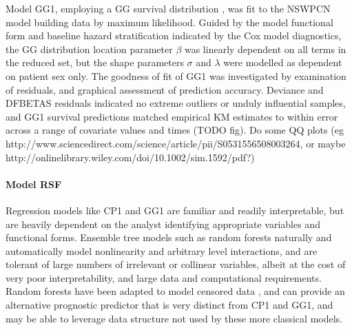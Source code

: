 \documentclass[dissertation.tex]{subfiles}
\begin{document}
Model GG1, employing a \gls{GG} survival distribution \cite{Cox2007}, was fit to the \gls{NSWPCN} model building data by maximum likelihood.  Guided by the model functional form and baseline hazard stratification indicated by the Cox model diagnostics, the \gls{GG} distribution location parameter $\beta$ was linearly dependent on all terms in the reduced set, but the shape parameters $\sigma$ and $\lambda$ were modelled as dependent on patient sex only.  The goodness of fit of GG1 was investigated by examination of residuals, and graphical assessment of prediction accuracy.  Deviance and DFBETAS residuals indicated no extreme outliers or unduly influential samples, and GG1 survival predictions matched empirical \gls{KM} estimates to within error across a range of covariate values and times \fref(TODO fig).  Do some QQ plots (eg http://www.sciencedirect.com/science/article/pii/S0531556508003264, or maybe http://onlinelibrary.wiley.com/doi/10.1002/sim.1592/pdf?)

\paragraph{Model RSF}
Regression models like CP1 and GG1 are familiar and readily interpretable, but are heavily dependent on the analyst identifying appropriate variables and functional forms.  Ensemble tree models such as random forests \cite{Breiman2001} naturally and automatically model nonlinearity and arbitrary level interactions, and are tolerant of large numbers of irrelevant or collinear variables, albeit at the cost of very poor interpretability, and large data and computational requirements.  Random forests have been adapted to model censored data \cite{Ishwaran2008}, and can provide an alternative prognostic predictor that is very distinct from CP1 and GG1, and may be able to leverage data structure not used by these more classical models.
\end{document}
